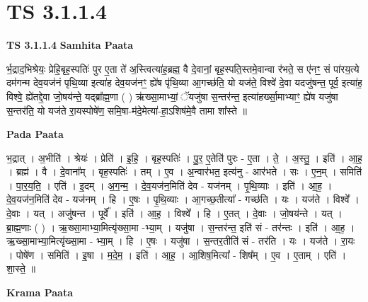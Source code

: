 \documentclass[17pt]{extarticle}
\begin{document}
\section{ TS 3.1.1.4 }

\textbf{TS 3.1.1.4 } \newline
\textbf{Samhita Paata} \newline

र्भ॒द्राद॒भिश्रेयः॒ प्रेहि॒बृह॒स्पतिः॑ पुर ए॒ता ते॑ अ॒स्त्वित्या॑ह॒ब्रह्म॒ वै दे॒वानां॒ बृह॒स्पति॒स्तमे॒वान्वा र॑भते॒ स ए॑नꣳ॒॒ सं पा॑रय॒त्ये दम॑गन्म देव॒यज॑नं पृथि॒व्या इत्या॑ह देव॒यज॑नꣳ॒॒ ह्ये॑ष पृ॑थि॒व्या आ॒गच्छ॑ति॒ यो यज॑ते॒ विश्वे॑ दे॒वा यदजु॑षन्त॒ पूर्व॒ इत्या॑ह॒ विश्वे॒ ह्ये॑तद्दे॒वा जो॒षय॑न्ते॒ यद्ब्रा᳚ह्म॒णा ( ) ऋ॑ख्सा॒माभ्यां॒ ॅयजु॑षा स॒न्तर॑न्त॒ इत्या॑हर्ख्सा॒माभ्याꣳ॒॒ ह्ये॑ष यजु॑षा स॒न्तर॑ति॒ यो यज॑ते रा॒यस्पोषे॑ण॒ समि॒षा-म॑दे॒मेत्या॑-हा॒ऽशिष॑मे॒वै तामा शा᳚स्ते ॥ \newline

\textbf{Pada Paata} \newline

भ॒द्रात् । अ॒भीति॑ । श्रेयः॑ । प्रेति॑ । इ॒हि॒ । बृह॒स्पतिः॑ । पु॒र॒ ए॒तेति॑ पुरः - ए॒ता । ते॒ । अ॒स्तु॒ । इति॑ । आ॒ह॒ । ब्रह्म॑ । वै । दे॒वाना᳚म् । बृह॒स्पतिः॑ । तम् । ए॒व । अ॒न्वार॑भत॒ इत्य॑नु - आर॑भते । सः । ए॒न॒म् । समिति॑ । पा॒र॒य॒ति॒ । एति॑ । इ॒दम् । अ॒ग॒न्म॒ । दे॒व॒यज॑न॒मिति॑ देव - यज॑नम् । पृ॒थि॒व्याः । इति॑ । आ॒ह॒ । दे॒व॒यज॑न॒मिति॑ देव - यज॑नम् । हि । ए॒षः । पृ॒थि॒व्याः । आ॒गच्छ॒तीत्या᳚ - गच्छ॑ति । यः । यज॑ते । विश्वे᳚ । दे॒वाः । यत् । अजु॑षन्त । पूर्वे᳚ । इति॑ । आ॒ह॒ । विश्वे᳚ । हि । ए॒तत् । दे॒वाः । जो॒षय॑न्ते । यत् । ब्रा॒ह्म॒णाः ( ) । ऋ॒ख्सा॒माभ्या॒मित्यृ॑ख्सा॒मा -भ्या॒म् । यजु॑षा । स॒न्तर॑न्त॒ इति॑ सं - तर॑न्तः । इति॑ । आ॒ह॒ । ऋ॒ख्सा॒माभ्या॒मित्यृ॑ख्सा॒मा - भ्या॒म् । हि । ए॒षः । यजु॑षा । स॒न्तर॒तीति॑ सं - तर॑ति । यः । यज॑ते । रा॒यः । पोषे॑ण । समिति॑ । इ॒षा । म॒दे॒म॒ । इति॑ । आ॒ह॒ । आ॒शिष॒मित्या᳚ - शिष᳚म् । ए॒व । ए॒ताम् । एति॑ । शा॒स्ते॒ ॥  \newline


\textbf{Krama Paata} \newline
\end{document}
